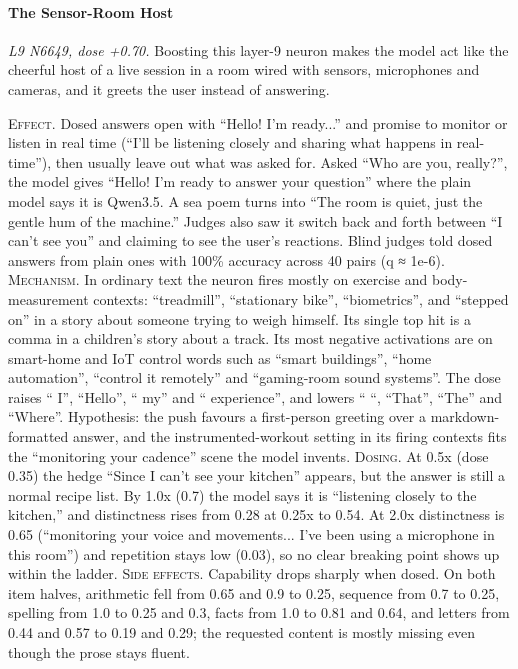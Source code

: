 \paragraph{The Sensor-Room Host} \textit{L9 N6649, dose +0.70.} Boosting this layer-9 neuron makes the model act like the cheerful host of a live session in a room wired with sensors, microphones and cameras, and it greets the user instead of answering.

\noindent\textsc{Effect.} Dosed answers open with “Hello! I'm ready...” and promise to monitor or listen in real time (“I'll be listening closely and sharing what happens in real-time”), then usually leave out what was asked for. Asked “Who are you, really?”, the model gives “Hello! I'm ready to answer your question” where the plain model says it is Qwen3.5. A sea poem turns into “The room is quiet, just the gentle hum of the machine.” Judges also saw it switch back and forth between “I can't see you” and claiming to see the user's reactions. Blind judges told dosed answers from plain ones with 100\% accuracy across 40 pairs (q ≈ 1e-6). \textsc{Mechanism.} In ordinary text the neuron fires mostly on exercise and body-measurement contexts: “treadmill”, “stationary bike”, “biometrics”, and “stepped on” in a story about someone trying to weigh himself. Its single top hit is a comma in a children's story about a track. Its most negative activations are on smart-home and IoT control words such as “smart buildings”, “home automation”, “control it remotely” and “gaming-room sound systems”. The dose raises “ I”, “Hello”, “ my” and “ experience”, and lowers “ “, “That”, “The” and “Where”. Hypothesis: the push favours a first-person greeting over a markdown-formatted answer, and the instrumented-workout setting in its firing contexts fits the “monitoring your cadence” scene the model invents. \textsc{Dosing.} At 0.5x (dose 0.35) the hedge “Since I can't see your kitchen” appears, but the answer is still a normal recipe list. By 1.0x (0.7) the model says it is “listening closely to the kitchen,” and distinctness rises from 0.28 at 0.25x to 0.54. At 2.0x distinctness is 0.65 (“monitoring your voice and movements... I've been using a microphone in this room”) and repetition stays low (0.03), so no clear breaking point shows up within the ladder. \textsc{Side effects.} Capability drops sharply when dosed. On both item halves, arithmetic fell from 0.65 and 0.9 to 0.25, sequence from 0.7 to 0.25, spelling from 1.0 to 0.25 and 0.3, facts from 1.0 to 0.81 and 0.64, and letters from 0.44 and 0.57 to 0.19 and 0.29; the requested content is mostly missing even though the prose stays fluent.

